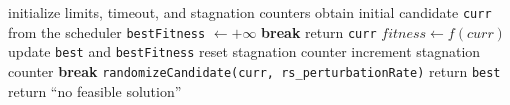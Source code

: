 \begin{algorithm}[H]
\caption{Random Search}
\begin{algorithmic}[1]
\State initialize limits, timeout, and stagnation counters
\State obtain initial candidate \texttt{curr} from the scheduler
\State \texttt{bestFitness} $\gets +\infty$
	 \State \textbf{break} \EndIf
			\State return \texttt{curr}
		\EndIf
		\State $fitness \gets f(curr)$
			\State update \texttt{best} and \texttt{bestFitness}
			\State reset stagnation counter
		\Else
			\State increment stagnation counter
			 \State \textbf{break} \EndIf
		\EndIf
	\EndIf
	\State \texttt{randomizeCandidate(curr, rs\_perturbationRate)}
\EndFor
{}
	\State return \texttt{best}
\Else
	\State return ``no feasible solution''
\EndIf
\end{algorithmic}
\end{algorithm}